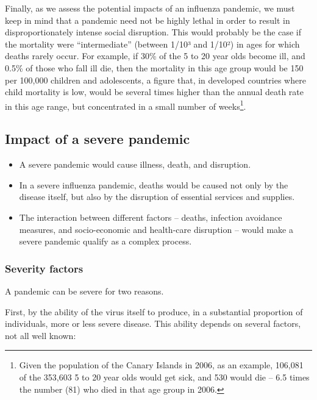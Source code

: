 \documentclass[12pt, a4]{scrartcl}
\begin{document}
Finally, as we assess the potential impacts of an influenza pandemic, we must keep in mind that a pandemic need not be highly lethal in order to result in disproportionately intense social disruption. This would probably be the case if the mortality were “intermediate” (between 1/10³ and 1/10²) in ages for which deaths rarely occur. For example, if 30\% of the 5 to 20 year olds become ill, and 0.5\% of those who fall ill die, then the mortality in this age group would be 150 per 100,000 children and adolescents, a figure that, in developed countries where child mortality is low, would be several times higher than the annual death rate in this age range, but concentrated in a small number of weeks\footnote{Given the population of the Canary Islands in 2006, as an example, 106,081 of the 353,603 5 to 20 year olds would get sick, and 530 would die – 6.5 times the number (81) who died in that age group in 2006.}.

\subsection {Impact of a severe pandemic}

\begin{mdframed}[leftmargin=10pt,rightmargin=10pt]
\begin{itemize}
	\item A severe pandemic would cause illness, death, and disruption.
	\item In a severe influenza pandemic, deaths would be caused not only by the disease itself, but also by the disruption of essential services and supplies.
	\item The interaction between different factors – deaths, infection avoidance measures, and socio-economic and health-care disruption – would make a severe pandemic qualify as
a complex process.
\end{itemize}
\end{mdframed}

\subsubsection {Severity factors}
A pandemic can be severe for two reasons.

First, by the ability of the virus itself to produce, in a substantial proportion of individuals, more or less severe disease. This ability depends on several factors, not all well known:
\end{document}
